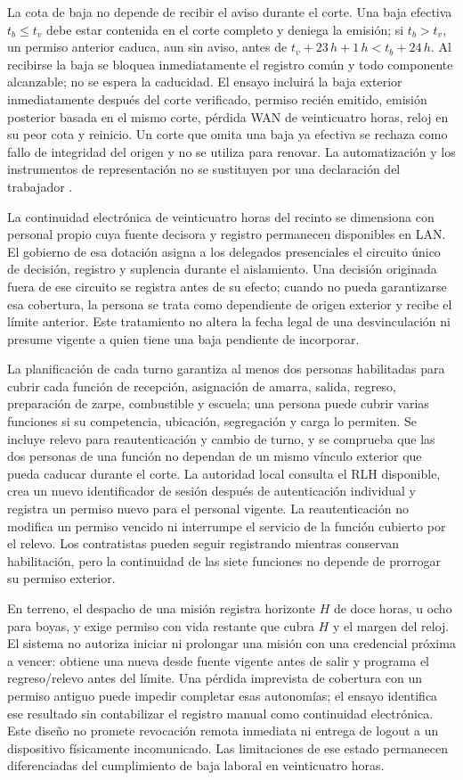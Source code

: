 La cota de baja no depende de recibir el aviso durante el corte. Una baja efectiva $t_b\leq t_v$ debe estar contenida en el corte completo y deniega la emisión; si $t_b>t_v$, un permiso anterior caduca, aun sin aviso, antes de $t_v+23\,h+1\,h<t_b+24\,h$. Al recibirse la baja se bloquea inmediatamente el registro común y todo componente alcanzable; no se espera la caducidad. El ensayo incluirá la baja exterior inmediatamente después del corte verificado, permiso recién emitido, emisión posterior basada en el mismo corte, pérdida WAN de veinticuatro horas, reloj en su peor cota y reinicio. Un corte que omita una baja ya efectiva se rechaza como fallo de integridad del origen y no se utiliza para renovar. La automatización y los instrumentos de representación no se sustituyen por una declaración del trabajador \parencite[RT-12.10]{bases-transversales}.

La continuidad electrónica de veinticuatro horas del recinto se dimensiona con personal propio cuya fuente decisora y registro permanecen disponibles en LAN. El gobierno de esa dotación asigna a los delegados presenciales el circuito único de decisión, registro y suplencia durante el aislamiento. Una decisión originada fuera de ese circuito se registra antes de su efecto; cuando no pueda garantizarse esa cobertura, la persona se trata como dependiente de origen exterior y recibe el límite anterior. Este tratamiento no altera la fecha legal de una desvinculación ni presume vigente a quien tiene una baja pendiente de incorporar.

La planificación de cada turno garantiza al menos dos personas habilitadas para cubrir cada función de recepción, asignación de amarra, salida, regreso, preparación de zarpe, combustible y escuela; una persona puede cubrir varias funciones si su competencia, ubicación, segregación y carga lo permiten. Se incluye relevo para reautenticación y cambio de turno, y se comprueba que las dos personas de una función no dependan de un mismo vínculo exterior que pueda caducar durante el corte. La autoridad local consulta el RLH disponible, crea un nuevo identificador de sesión después de autenticación individual y registra un permiso nuevo para el personal vigente. La reautenticación no modifica un permiso vencido ni interrumpe el servicio de la función cubierto por el relevo. Los contratistas pueden seguir registrando mientras conservan habilitación, pero la continuidad de las siete funciones no depende de prorrogar su permiso exterior.

En terreno, el despacho de una misión registra horizonte $H$ de doce horas, u ocho para boyas, y exige permiso con vida restante que cubra $H$ y el margen del reloj. El sistema no autoriza iniciar ni prolongar una misión con una credencial próxima a vencer: obtiene una nueva desde fuente vigente antes de salir y programa el regreso/relevo antes del límite. Una pérdida imprevista de cobertura con un permiso antiguo puede impedir completar esas autonomías; el ensayo identifica ese resultado sin contabilizar el registro manual como continuidad electrónica. Este diseño no promete revocación remota inmediata ni entrega de logout a un dispositivo físicamente incomunicado. Las limitaciones de ese estado permanecen diferenciadas del cumplimiento de baja laboral en veinticuatro horas.

